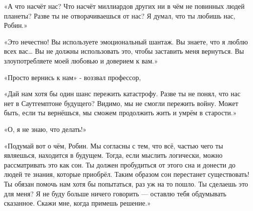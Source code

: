 \documentclass[a4paper,12pt]{book}
\begin{document}
\par
«А что насчёт нас? Что насчёт миллиардов других ни в чём не повинных людей планеты? Разве ты не отворачиваешься от нас? Я думал, что ты любишь нас, Робин.»
\par
«Это нечестно! Вы используете эмоциональный шантаж. Вы знаете, что я люблю всех вас… Вы не должны использовать это, чтобы заставить меня вернуться. Вы злоупотребляете моей любовью и доверием к вам.»
\par
«Просто вернись к нам» - воззвал профессор,
\par
«Дай нам хотя бы один шанс пережить катастрофу. Разве ты не понял, что нас нет в Саутгемптоне будущего? Видимо, мы не смогли пережить войну. Может быть, если ты вернёшься, мы сможем продолжить жить и умрём в старости.»
\par
«О, я не знаю, что делать!»
\par
«Подумай вот о чём, Робин. Мы согласны с тем, что всё, частью чего ты являешься, находится в будущем. Тогда, если мыслить логически, можно рассматривать это как сон. Ты должен пробудиться от этого сна и донести до людей те знания, которые приобрёл. Таким образом сон перестанет существовать! Ты обязан помочь нам хотя бы попытаться, раз уж на то пошло. Ты сделаешь это для меня? Я не буду больше ничего говорить — оставлю тебя обдумывать сказанное. Скажи мне, когда примешь решение.»\\
\end{document}
